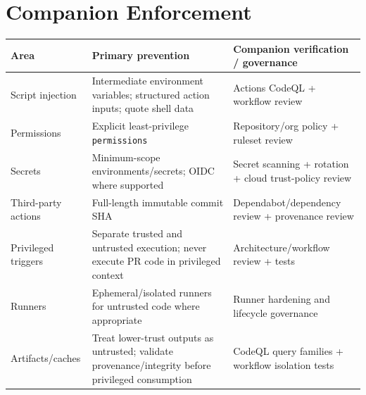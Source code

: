\documentclass[10pt,letterpaper]{article}
\newcommand{\code}[1]{\texttt{\small #1}}
\begin{document}
\section{Companion Enforcement}
\begin{tabularx}{\textwidth}{@{}P{1.45in}Y P{2.3in}@{}}
\toprule
\textbf{Area} & \textbf{Primary prevention} & \textbf{Companion verification / governance}\\
\midrule
Script injection & Intermediate environment variables; structured action inputs; quote shell data & Actions CodeQL + workflow review\\
Permissions & Explicit least-privilege \code{permissions} & Repository/org policy + ruleset review\\
Secrets & Minimum-scope environments/secrets; OIDC where supported & Secret scanning + rotation + cloud trust-policy review\\
Third-party actions & Full-length immutable commit SHA & Dependabot/dependency review + provenance review\\
Privileged triggers & Separate trusted and untrusted execution; never execute PR code in privileged context & Architecture/workflow review + tests\\
Runners & Ephemeral/isolated runners for untrusted code where appropriate & Runner hardening and lifecycle governance\\
Artifacts/caches & Treat lower-trust outputs as untrusted; validate provenance/integrity before privileged consumption & CodeQL query families + workflow isolation tests\\
\bottomrule
\end{tabularx}
\end{document}
